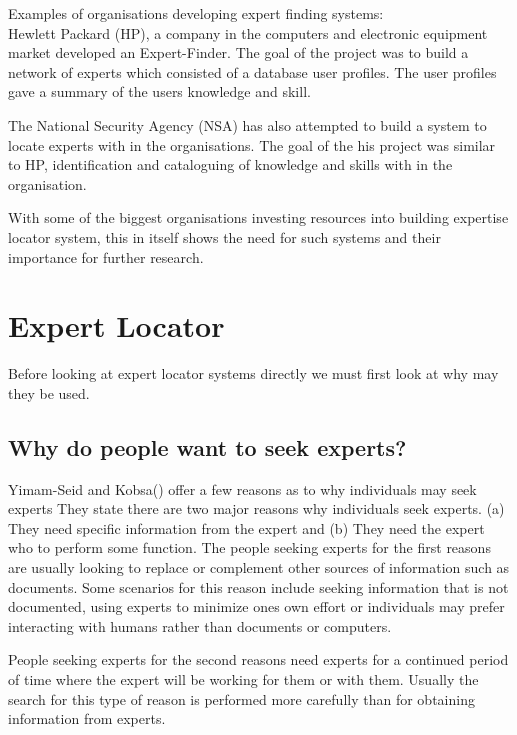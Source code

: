 \documentclass[a4paper,oneside,11pt]{report}
\begin{document}
Examples of organisations developing expert finding systems: \\
Hewlett Packard (HP), a company in the computers and electronic equipment market developed  an Expert-Finder. The goal of the project was to build a network of experts which consisted of a database user profiles. The user profiles gave a summary of the users knowledge and skill\autocite{fernandez2000}.
 
The National Security Agency (NSA) has also attempted to build a system to locate experts with in the organisations. The goal of the his project was similar to HP, identification and cataloguing of knowledge and skills with in the organisation\autocite{fernandez2000}.


With some of the biggest organisations investing resources into building expertise locator system, this in itself shows the need for such systems and their importance for further research. 

\section{Expert Locator}
Before looking at expert locator systems directly we must first look at why may they be used.
\subsection{Why do people want to seek experts?}
Yimam-Seid and Kobsa(\citeyear{kobsaseid2003}) offer a few reasons as to why individuals may seek experts They state there are two major reasons why individuals seek experts. (a) They need specific information from the expert and (b) They need the expert who to perform some function. The people seeking experts for the first reasons are usually looking to replace or complement other sources of information such as documents. Some scenarios for this reason include seeking information that is not documented, using experts to minimize ones own effort or individuals may prefer interacting with humans rather than documents or computers. 

People seeking experts for the second reasons need experts for a continued period of time where the expert will be working for them or with them. Usually the search for this type of reason is performed more carefully than for obtaining information from experts.
\end{document}
